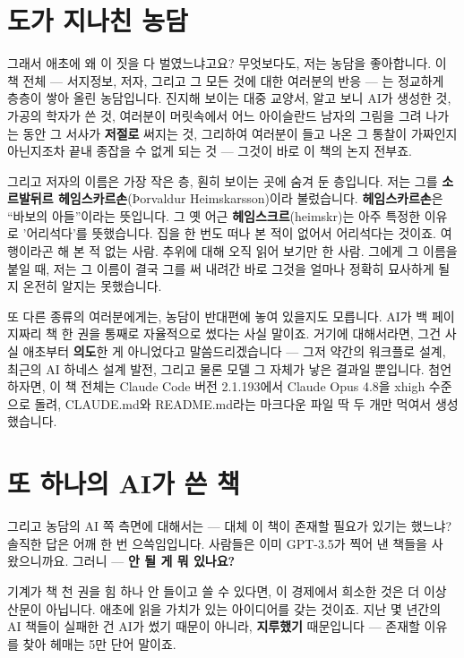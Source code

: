 \section*{도가 지나친 농담}

그래서 애초에 왜 이 짓을 다 벌였느냐고요? 무엇보다도, 저는 농담을 좋아합니다. 이 책 전체 — 서지정보, 저자, 그리고 그 모든 것에 대한 여러분의 반응 — 는 정교하게 층층이 쌓아 올린 농담입니다. 진지해 보이는 대중 교양서, 알고 보니 AI가 생성한 것, 가공의 학자가 쓴 것, 여러분이 머릿속에서 어느 아이슬란드 남자의 그림을 그려 나가는 동안 그 서사가 \textbf{저절로} 써지는 것, 그리하여 여러분이 들고 나온 그 통찰이 가짜인지 아닌지조차 끝내 종잡을 수 없게 되는 것 — 그것이 바로 이 책의 논지 전부죠.

그리고 저자의 이름은 가장 작은 층, 훤히 보이는 곳에 숨겨 둔 층입니다. 저는 그를 \textbf{소르발뒤르 헤임스카르손}(Þorvaldur Heimskarsson)이라 불렀습니다. \textbf{헤임스카르손}은 ``바보의 아들''이라는 뜻입니다. 그 옛 어근 \textbf{헤임스크르}(heimskr)는 아주 특정한 이유로 '어리석다'를 뜻했습니다. 집을 한 번도 떠나 본 적이 없어서 어리석다는 것이죠. 여행이라곤 해 본 적 없는 사람. 추위에 대해 오직 읽어 보기만 한 사람. 그에게 그 이름을 붙일 때, 저는 그 이름이 결국 그를 써 내려간 바로 그것을 얼마나 정확히 묘사하게 될지 온전히 알지는 못했습니다.

또 다른 종류의 여러분에게는, 농담이 반대편에 놓여 있을지도 모릅니다. AI가 백 페이지짜리 책 한 권을 통째로 자율적으로 썼다는 사실 말이죠. 거기에 대해서라면, 그건 사실 애초부터 \textbf{의도}한 게 아니었다고 말씀드리겠습니다 — 그저 약간의 워크플로 설계, 최근의 AI 하네스 설계 발전, 그리고 물론 모델 그 자체가 낳은 결과일 뿐입니다. 첨언하자면, 이 책 전체는 Claude Code 버전 2.1.193에서 Claude Opus 4.8을 xhigh 수준으로 돌려, CLAUDE.md와 README.md라는 마크다운 파일 딱 두 개만 먹여서 생성했습니다.

\section*{또 하나의 AI가 쓴 책}

그리고 농담의 AI 쪽 측면에 대해서는 — 대체 이 책이 존재할 필요가 있기는 했느냐? 솔직한 답은 어깨 한 번 으쓱임입니다. 사람들은 이미 GPT-3.5가 찍어 낸 책들을 사 왔으니까요. 그러니 — \textbf{안 될 게 뭐 있나요?}

기계가 책 천 권을 힘 하나 안 들이고 쓸 수 있다면, 이 경제에서 희소한 것은 더 이상 산문이 아닙니다. 애초에 읽을 가치가 있는 아이디어를 갖는 것이죠. 지난 몇 년간의 AI 책들이 실패한 건 AI가 썼기 때문이 아니라, \textbf{지루했기} 때문입니다 — 존재할 이유를 찾아 헤매는 5만 단어 말이죠.

